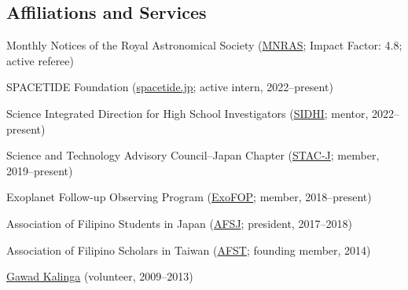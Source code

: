 \documentclass[12pt,letterpaper]{article}
\begin{document}
\subsection{Affiliations and Services}
\begin{list}{}{\cvlist}
    \item Monthly Notices of the Royal Astronomical Society (\href{https://academic.oup.com/mnras}{MNRAS}; Impact Factor: 4.8; active referee)
    \item SPACETIDE Foundation (\href{https://spacetide.jp/en/}{spacetide.jp}; active intern, 2022--present)
    \item Science Integrated Direction for High School Investigators (\href{https://www.sidhi.org/}{SIDHI}; mentor, 2022--present)
    \item Science and Technology Advisory Council--Japan Chapter (\href{https://www.facebook.com/profile.php?id=100083271798519}{STAC-J}; member, 2019--present)
    \item Exoplanet Follow-up Observing Program (\href{https://exofop.ipac.caltech.edu/tess/}{ExoFOP}; member, 2018--present)
    \item Association of Filipino Students in Japan (\href{https://www.facebook.com/afsjpage}{AFSJ}; president, 2017--2018)
    \item Association of Filipino Scholars in Taiwan (\href{https://www.facebook.com/AssocIskolar}{AFST}; founding member, 2014)
    \item \href{https://gk1world.com/volunteer}{Gawad Kalinga} (volunteer, 2009--2013)
\end{list}
\end{document}
